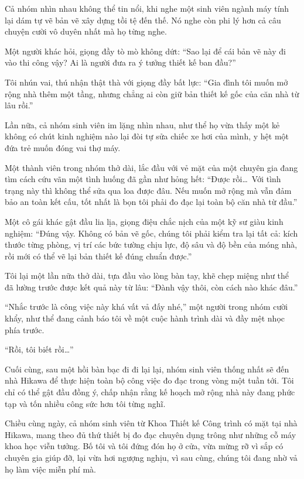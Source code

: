 \documentclass[../main.tex]{subfiles}
\begin{document}
Cả nhóm nhìn nhau không thể tin nổi, khi nghe một sinh viên ngành máy tính lại dám tự vẽ bản vẽ xây dựng tồi tệ đến thế. Nó nghe còn phi lý hơn cả câu chuyện cười vô duyên nhất mà họ từng nghe.

Một người khác hỏi, giọng đầy tò mò không dứt: ``Sao lại để cái bản vẽ này đi vào thi công vậy? Ai là người đưa ra ý tưởng thiết kế ban đầu?''

Tôi nhún vai, thú nhận thật thà với giọng đầy bất lực: ``Gia đình tôi muốn mở rộng nhà thêm một tầng, nhưng chẳng ai còn giữ bản thiết kế gốc của căn nhà từ lâu rồi.''

Lần nữa, cả nhóm sinh viên im lặng nhìn nhau, như thể họ vừa thấy một kẻ không có chút kinh nghiệm nào lại đòi tự sửa chiếc xe hơi của mình, y hệt một đứa trẻ muốn đóng vai thợ máy.

Một thành viên trong nhóm thở dài, lắc đầu với vẻ mặt của một chuyên gia đang tìm cách cứu vãn một tình huống đã gần như hỏng hết: ``Được rồi\dots\ Với tình trạng này thì không thể sửa qua loa được đâu. Nếu muốn mở rộng mà vẫn đảm bảo an toàn kết cấu, tốt nhất là bọn tôi phải đo đạc lại toàn bộ căn nhà từ đầu.''

Một cô gái khác gật đầu lia lịa, giọng điệu chắc nịch của một kỹ sư giàu kinh nghiệm: ``Đúng vậy. Không có bản vẽ gốc, chúng tôi phải kiểm tra lại tất cả: kích thước từng phòng, vị trí các bức tường chịu lực, độ sâu và độ bền của móng nhà, rồi mới có thể vẽ lại bản thiết kế đúng chuẩn được.''

Tôi lại một lần nữa thở dài, tựa đầu vào lòng bàn tay, khẽ chẹp miệng như thể đã lường trước được kết quả này từ lâu: ``Đành vậy thôi, còn cách nào khác đâu.''

``Nhắc trước là công việc này khá vất vả đấy nhé,'' một người trong nhóm cười khẩy, như thể đang cảnh báo tôi về một cuộc hành trình dài và đầy mệt nhọc phía trước.

``Rồi, tôi biết rồi\dots''

Cuối cùng, sau một hồi bàn bạc đi đi lại lại, nhóm sinh viên thống nhất sẽ đến nhà Hikawa để thực hiện toàn bộ công việc đo đạc trong vòng một tuần tới. Tôi chỉ có thể gật đầu đồng ý, chấp nhận rằng kế hoạch mở rộng nhà này đang phức tạp và tốn nhiều công sức hơn tôi từng nghĩ.

\ct

Chiều cùng ngày, cả nhóm sinh viên từ Khoa Thiết kế Công trình có mặt tại nhà Hikawa, mang theo đủ thứ thiết bị đo đạc chuyên dụng trông như những cỗ máy khoa học viễn tưởng. Bố tôi và tôi đứng đón họ ở cửa, vừa mừng rỡ vì sắp có chuyên gia giúp đỡ, lại vừa hơi ngượng nghịu, vì sau cùng, chúng tôi đang nhờ vả họ làm việc miễn phí mà.
\end{document}
